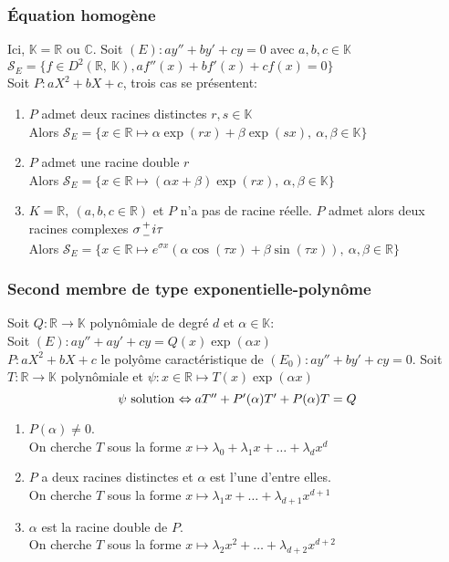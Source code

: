 \documentclass[fleqn]{article}
\theoremstyle{definition} \newtheorem*{defi}{D\'efinition}
\theoremstyle{definition} \newtheorem*{theo}{Th\'eor\`eme}
\theoremstyle{remark} \newtheorem*{rqs}{Remarques}
\newcommand*{\bfrac}[2]{\genfrac{}{}{0pt}{}{#1}{#2}}
\begin{document}
\subsubsection{\'Equation homog\`ene}
Ici, $\mathbb{K} = \mathbb{R}$ ou $\mathbb{C}$. Soit $(E): ay'' + by' + cy = 0$ avec $a,b,c \in \mathbb{K}$\\
$\mathscr{S}_E = \{f \in D^2(\mathbb{R},\ \mathbb{K}), af''(x) + bf'(x) + cf(x) = 0\}$\\
Soit $P: aX^2 + bX + c$, trois cas se pr\'esentent:
\begin{enumerate}
	\item $P$ admet deux racines distinctes $r,s \in \mathbb{K}$ \\
		Alors $\mathscr{S}_E = \{x \in \mathbb{R} \mapsto \alpha \exp(rx) + \beta \exp(sx),\ \alpha, \beta \in \mathbb{K}\}$
	\item $P$ admet une racine double $r$\\
		Alors $\mathscr{S}_E = \{x \in \mathbb{R} \mapsto (\alpha x + \beta) \exp(rx),\ \alpha, \beta \in \mathbb{K}\}$
	\item $K = \mathbb{R},\ (a,b,c \in \mathbb{R})$ et $P$ n'a pas de racine r\'eelle. $P$ admet alors deux racines complexes
		$\sigma \bfrac{+}{-} i\tau$ \\
		Alors $\mathscr{S}_E = \{x \in \mathbb{R} \mapsto e^{\sigma x}(\alpha \cos(\tau x) + \beta \sin(\tau x)),\ \alpha, \beta \in \mathbb{R}\}$
\end{enumerate}

\subsubsection{Second membre de type exponentielle-polyn\^ome}
Soit $Q: \mathbb{R} \rightarrow \mathbb{K}$ polyn\^omiale de degr\'e $d$ et $\alpha \in \mathbb{K}$:\\ Soit $(E): ay'' + ay' + cy =
Q(x)\exp(\alpha x)$ \\ $P: aX^2 + bX + c$ le poly\^ome caract\'eristique de $(E_0): ay'' + by' + cy = 0$. Soit $T: \mathbb{R}
\rightarrow \mathbb{K}$ polyn\^omiale et $\psi: x \in \mathbb{R} \mapsto T(x) \exp(\alpha x)$
\[\psi$ solution $\Leftrightarrow aT'' + P'(\alpha)T' + P(\alpha)T = Q\]
\begin{enumerate}
	\item $P(\alpha) \neq 0$. \\
		On cherche $T$ sous la forme $x \mapsto \lambda_0 + \lambda_1 x + \hdots + \lambda_d x^d$
	\item $P$ a deux racines distinctes et $\alpha$ est l'une d'entre elles.\\
		On cherche $T$ sous la forme $x \mapsto \lambda_1 x + \hdots + \lambda_{d+1} x^{d+1}$
	\item $\alpha$ est la racine double de $P$.\\
		On cherche $T$ sous la forme $x \mapsto \lambda_2 x^2 + \hdots + \lambda_{d+2} x^{d+2}$
\end{enumerate}
\end{document}
